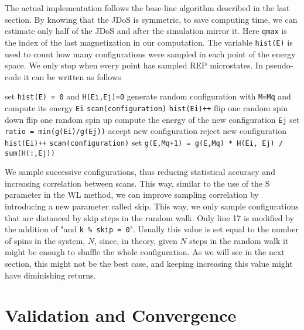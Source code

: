 	The actual implementation follows the base-line algorithm described in the last section. By knowing that the JDoS is symmetric, to save computing time, we can estimate only half of the JDoS and after the simulation mirror it. Here \texttt{qmax} is the index of the last magnetization in our computation. The variable \texttt{hist(E)} is used to count how many configurations were sampled in each point of the energy space. We only stop when every point has sampled REP microstates. In pseudo-code it can be written as follows 
	
\begin{algorithm}
	\begin{algorithmic}[1]
		 	\State set \texttt{hist(E) = 0} and \texttt{H(Ei,Ej)=0}
		 	\State generate random configuration with \texttt{M=Mq} and compute its energy \texttt{Ei}
		 	\State \texttt{scan(configuration)}
		 	\State \texttt{hist(Ei)++}
		 		\State flip one random spin down
		 		\State flip one random spin up
		 		\State compute the energy of the new configuration \texttt{Ej}
		 		\State set \texttt{ratio = min(g(Ei)/g(Ej))}
					\State accept new configuration
				\Else
					\State reject new configuration
		 		\EndIf
		 			\State \texttt{hist(Ei)++}
			 		\State \texttt{scan(configuration)}
		 		\EndIf
		 	\EndWhile
		 	\State set \texttt{g(E,Mq+1) = g(E,Mq) * H(Ei, Ej) / sum(H(:,Ej))} 
		 \EndFor
	\end{algorithmic} 
\end{algorithm}

	We sample successive configurations, thus reducing statistical accuracy and increasing correlation between scans. This way, similar to the use of the S parameter in the WL method, we can improve sampling correlation by introducing a new parameter called skip. This way, we only sample configurations that are distanced by skip steps in the random walk. Only line 17 is modified by the addition of "and \texttt{k \% skip = 0}". Usually this value is set equal to the number of spins in the system, $N$, since, in theory, given $N$ steps in the random walk it might be enough to shuffle the whole configuration. As we will see in the next section, this might not be the best case, and keeping increasing this value might have diminishing returns.
	
\section{Validation and Convergence}

